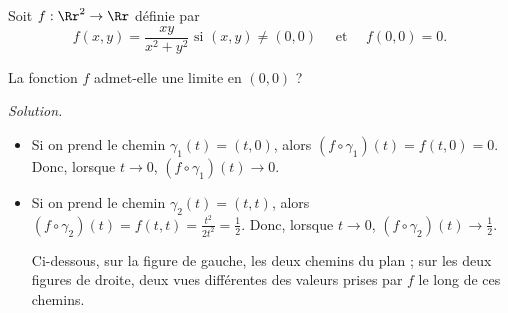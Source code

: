 \documentclass[11pt, class=report,crop=false]{standalone}
\begin{document}

\begin{exemple}
Soit $f : \Rr^2 \to \Rr$ définie par 
$$f(x,y) = \frac{xy}{x^2+y^2} \text{ si } (x,y) \neq (0,0) \quad \text{ et } \quad
f(0,0) =0.$$

La fonction $f$ admet-elle une limite en $(0,0)$ ?

\bigskip
\emph{Solution.}

\begin{itemize}
  \item Si on prend le chemin $\gamma_1(t) = (t,0)$, alors 
  $(f \circ \gamma_1) (t) = f(t,0) = 0$. Donc, lorsque $t \to 0$, $(f \circ \gamma_1) (t) \to 0$.
  
  \item Si on prend le chemin $\gamma_2(t) = (t,t)$, alors 
  $(f \circ \gamma_2) (t) = f(t,t) = \frac{t^2}{2t^2} = \frac12$. Donc, lorsque $t \to 0$, $(f \circ \gamma_2) (t) \to \frac 12$.


Ci-dessous, sur la figure de gauche, les deux chemins du plan ; 
sur les deux figures de droite, deux vues différentes des valeurs prises par $f$ le long de ces chemins.


\end{itemize}
\end{exemple}
\end{document}
